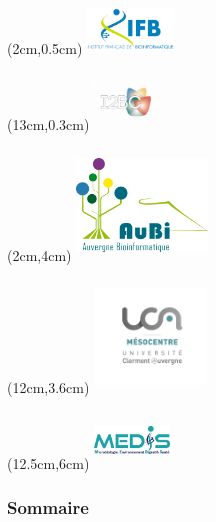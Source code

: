 
\begin{frame}
  \titlepage
  \begin{textblock*}{5cm}(2cm,0.5cm) %
  \includegraphics[width=2.3cm,height=1.3cm]{images/logo_ifb.pdf}
  \end{textblock*}
  \begin{textblock*}{5cm}(13cm,0.3cm) %
  \includegraphics[width=1.5cm,height=1.5cm]{images/i2bc.png}
  \end{textblock*}
  \begin{textblock*}{5cm}(2cm,4cm) %
  \includegraphics[width=3.5cm,height=3cm]{images/logoAuBi-2019.pdf}
  \end{textblock*}
  \begin{textblock*}{5cm}(12cm,3.6cm) %
  \includegraphics[width=3cm,height=3cm]{images/mesocentre.png}
  \end{textblock*}
   \begin{textblock*}{5cm}(12.5cm,6cm) %
  \includegraphics[width=2cm,height=1.5cm]{images/medis_logo.png}
  \end{textblock*}
\end{frame}
\begin{frame}
  \frametitle{Sommaire}
  \begin{multicols*}{2}
  \tableofcontents
  \end{multicols*}
\end{frame}
